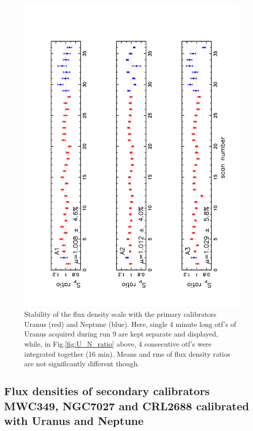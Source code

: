 \begin{figure}
\begin{center}
  \includegraphics[clip, angle=-90, scale=0.6]{Figures/Flux_ratio_index_A1_A2_A3.pdf}
  \caption{Stability of the flux density scale with the primary calibrators Uranus (red) and Neptune (blue).
    Here, single 4 minute long otf's of Uranus acquired during run 9 are kept separate
    and displayed, while, in Fig.\ref{fig:U_N_ratio} above, 4 consecutive otf's were integrated together (16 min).
    Means and rms of flux density ratios are not significantly different though.}
\label{fig:U_otf_indiv}
\end{center}
\end{figure}

\subsection{Flux densities of secondary calibrators MWC349, NGC7027 and CRL2688 calibrated with Uranus and Neptune}

